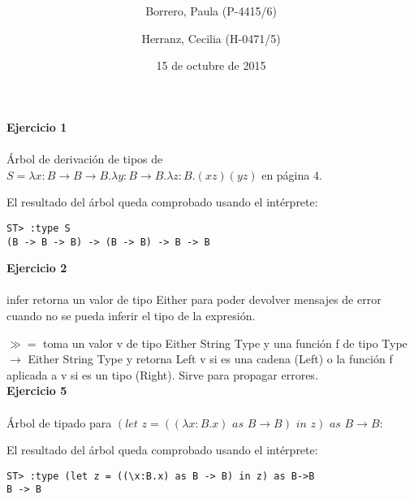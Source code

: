 \documentclass[12pt, a4paper]{article}
\title{
\vspace{2in}
\textmd{\textbf{\hmwkClassTitle}}\\
\vspace{0.1in}\large{\textit{\hmwkClassName}}
\vspace{3in}
}
\date{15 de octubre de 2015}
\author{Borrero, Paula (P-4415/6) \and Herranz, Cecilia (H-0471/5) }
\begin{document}
\maketitle
\marginsize{2cm}{2cm}{2cm}{2cm}
\newpage
{\bf Ejercicio 1}\\
\\
Árbol de derivación de tipos de $S = \lambda x:B\rightarrow B\rightarrow B.\lambda y:B\rightarrow B.\lambda z:B.(x z) (y z)$ en página 4.

El resultado del árbol queda comprobado usando el intérprete:
\vspace{-0.5cm}
\begin{verbatim}
ST> :type S
(B -> B -> B) -> (B -> B) -> B -> B
\end{verbatim}

{\bf Ejercicio 2}\\
\\
infer retorna un valor de tipo Either para poder devolver mensajes de error cuando no se pueda inferir el tipo de la expresión.

$\gg =$ toma un valor v de tipo Either String Type y una función f de tipo Type $\rightarrow$ Either String Type y retorna Left v si es una cadena (Left) o la función f aplicada a v si es un tipo (Right). Sirve para propagar errores.
\\

{\bf Ejercicio 5}\\
\\
Árbol de tipado para $(let\,\, z = ((\lambda x : B. x)\,\, as\,\, B \rightarrow B)\,\, in\,\,z)\,\, as\,\, B \rightarrow B$:
\begin{center}
\begin{minipage}{\linewidth}
\end{minipage}
\end{center}

El resultado del árbol queda comprobado usando el intérprete:
\vspace{-0.5cm}
\begin{verbatim}
ST> :type (let z = ((\x:B.x) as B -> B) in z) as B->B
B -> B
\end{verbatim}
\end{document}
